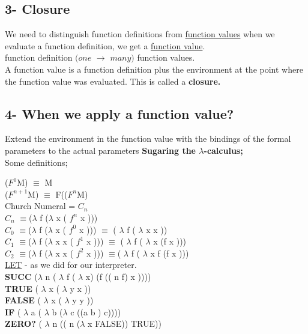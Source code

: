 \documentclass{article}
\begin{document}
\subsection*{3- Closure}
\begin{flushleft}
We need to distinguish function definitions from \underline{function values} when we evaluate a function definition, we get a \underline{function value}. \\

\doublespacing
function definition $(one$ $\rightarrow$ $many)$ function values.\\

A function value is a function definition plus the environment at the point where the function value was evaluated. This is called a \textbf {closure.}
\end{flushleft}

\subsection*{4- When we apply a function value?}

Extend the environment in the function value with the bindings of the formal parameters to the actual parameters
\doublespacing
\textbf{Sugaring the $\lambda$-calculus; }\\
\vspace{2mm} Some definitions;

($F^{0}$M)  $\equiv$ M\\
($F^{n+1}$M)  $\equiv$ F(($F^{n}$M)\\

Church Numeral = $C_n$\\
$C_n$ $\equiv$($\lambda$ f ($\lambda$ x ( $f^{n}$ x )))\\
$C_0$ $\equiv$($\lambda$ f ($\lambda$ x ( $f^{0}$ x )))  $\equiv$ ( $\lambda$ f ( $\lambda$ x x )) \\
$C_1$ $\equiv$($\lambda$ f ($\lambda$ x x ( $f^{1}$ x )))  $\equiv$ ( $\lambda$ f ( $\lambda$ x (f x ))) \\
$C_2$ $\equiv$($\lambda$ f ($\lambda$ x x ( $f^{2}$ x )))  $\equiv$( $\lambda$ f ( $\lambda$ x f (f x ))) \\
\doublespacing
\underline{LET} - as we did for our interpreter.\\
\textbf{SUCC} ($\lambda$ n ( $\lambda$ f ( $\lambda$ x) (f (( n f) x ))))\\
\textbf{TRUE} ( $\lambda$ x ( $\lambda$ y x ))\\
\textbf{FALSE} ( $\lambda$ x ( $\lambda$ y y ))\\
\textbf{IF} ( $\lambda$ a ( $\lambda$ b ($\lambda$ c ((a b ) c))))\\
\textbf{ZERO?} ( $\lambda$ n (( n ($\lambda$ x FALSE)) TRUE))\\
\end{document}
